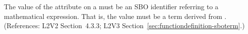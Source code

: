 The value of the  attribute on a \FunctionDefinition must be an
SBO identifier referring to a mathematical expression.  That is, the value
must be a term derived from \sbomathformula.  (References: L2V2 Section~4.3.3;
L2V3 Section~\ref{sec:functiondefinition-sboterm}.)
